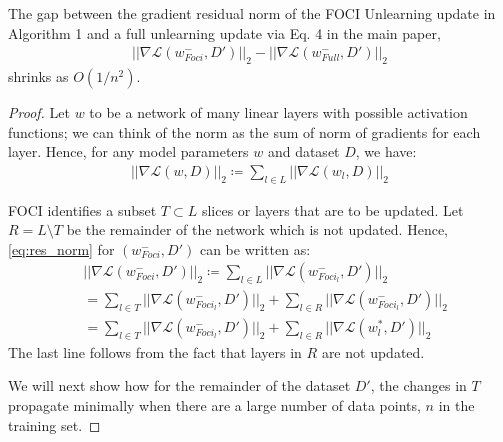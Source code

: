 \begin{lemma}
The gap between the gradient residual norm of the FOCI Unlearning update in Algorithm 1 and a full unlearning update via Eq. 4 in the main paper,
\begin{align}
||\nabla \mathcal{L}(w^-_{Foci},D')||_2 - ||\nabla \mathcal{L}(w^-_{Full},D')||_2
\end{align}
shrinks as $O(1/n^2)$.
\end{lemma}
\begin{proof}
Let $w$ to be a network of many linear layers with possible activation functions; we can think of the norm as the sum of norm of gradients for each layer. Hence, for any model parameters $w$ and dataset $D$, we have:
\begin{align}
    \label{eq:res_norm}
    ||\nabla \mathcal{L}(w,D)||_2 \coloneqq \sum_{l \in L} ||\nabla \mathcal{L}(w_l, D) ||_2
\end{align}

FOCI identifies a subset $T \subset L$ slices or layers that are to be updated. 
Let $R = L \setminus T$ be the remainder of the network which is not updated.
Hence, \ref{eq:res_norm} for $(w^-_{Foci}, D')$ can be written as:
\begin{align}
    \label{eq:foci_res_norm}
    & ||\nabla \mathcal{L}(w^-_{Foci},D')||_2 \coloneqq \sum_{l \in L} ||\nabla \mathcal{L}(w^-_{Foci_l}, D') ||_2 \\
    & = \sum_{l \in T} ||\nabla \mathcal{L}(w^-_{Foci_l}, D') ||_2 + 
     \sum_{l \in R} ||\nabla \mathcal{L}(w^-_{Foci_l}, D') ||_2 \\
    & = \sum_{l \in T} ||\nabla \mathcal{L}(w^-_{Foci_l}, D') ||_2 + 
    \sum_{l \in R} ||\nabla \mathcal{L}(w^*_{l}, D') ||_2
\end{align}
The last line follows from the fact that layers in $R$ are not updated.

We will next show how for the remainder of the dataset $D'$, the changes in $T$ propagate minimally when there are a large number of data points, $n$ in the training set.


\end{proof}
